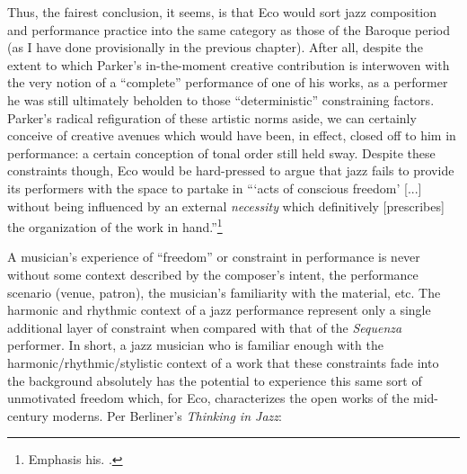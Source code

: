    
    Thus, the fairest conclusion, it seems, is that Eco would sort jazz composition and performance practice into the same category as those of the Baroque period (as I have done provisionally in the previous chapter). After all, despite the extent to which Parker's in-the-moment creative contribution is interwoven with the very notion of a ``complete'' performance of one of his works, as a performer he was still ultimately beholden to those ``deterministic'' constraining factors. Parker's radical refiguration of these artistic norms aside, we can certainly conceive of creative avenues which would have been, in effect, closed off to him in performance: a certain conception of tonal order still held sway. Despite these constraints though, Eco would be hard-pressed to argue that jazz fails to provide its performers with the space to partake in ```acts of conscious freedom' [...] without being influenced by an external \textit{necessity} which definitively [prescribes] the organization of the work in hand.''\footnote{Emphasis his. \autocite[4]{Eco_Robey_1989}.}

    A musician's experience of ``freedom'' or constraint in performance is never without some context described by the composer's intent, the performance scenario (venue, patron), the musician's familiarity with the material, etc. The harmonic and rhythmic context of a jazz performance represent only a single additional layer of constraint when compared with that of the \textit{Sequenza} performer. In short, a jazz musician who is familiar enough with the harmonic/rhythmic/stylistic context of a work that these constraints fade into the background absolutely has the potential to experience this same sort of unmotivated freedom which, for Eco, characterizes the open works of the mid-century moderns. Per Berliner's \textit{Thinking in Jazz}: 

